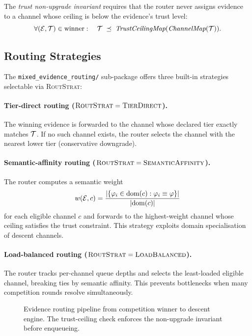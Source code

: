 \documentclass[11pt]{article}
\providecommand{\Bid}{\mathsf{B}}                 %
\providecommand{\EvidRouter}{\textsc{EvidRouter}} %
\providecommand{\RoutStrat}{\textsc{RoutStrat}}   %
\providecommand{\winner}{\mathrm{win}}            %
\begin{document}
The \emph{trust non-upgrade invariant} requires that the router never assigns
evidence to a channel whose ceiling is below the evidence's trust level:
\[
  \forall (\mathcal{E}, \mathcal{T}) \in \text{winner}:\quad
    \mathcal{T} \;\preceq\; \textit{TrustCeilingMap}(\textit{ChannelMap}(\mathcal{T})).
\]

\subsection{Routing Strategies}

The \texttt{mixed\_evidence\_routing/} sub-package offers three built-in
strategies selectable via \RoutStrat{}:

\paragraph{Tier-direct routing ($\RoutStrat = \textsc{TierDirect}$).}
The winning evidence is forwarded to the channel whose declared tier exactly
matches $\mathcal{T}$.  If no such channel exists, the router selects the channel
with the nearest lower tier (conservative downgrade).

\paragraph{Semantic-affinity routing ($\RoutStrat = \textsc{SemanticAffinity}$).}
The router computes a semantic weight
\[
  w(\mathcal{E}, c) = \frac{|\{\varphi_i \in \mathrm{dom}(c) : \varphi_i \equiv \varphi\}|}{|\mathrm{dom}(c)|}
\]
for each eligible channel $c$ and forwards to the highest-weight channel
whose ceiling satisfies the trust constraint.  This strategy exploits
domain specialisation of descent channels.

\paragraph{Load-balanced routing ($\RoutStrat = \textsc{LoadBalanced}$).}
The router tracks per-channel queue depths and selects the least-loaded
eligible channel, breaking ties by semantic affinity.  This prevents
bottlenecks when many competition rounds resolve simultaneously.

\begin{figure}[H]
\centering
{}
\caption{Evidence routing pipeline from competition winner to descent engine.
  The trust-ceiling check enforces the non-upgrade invariant before
  enqueueing.}
\label{fig:routing}
\end{figure}
\end{document}
